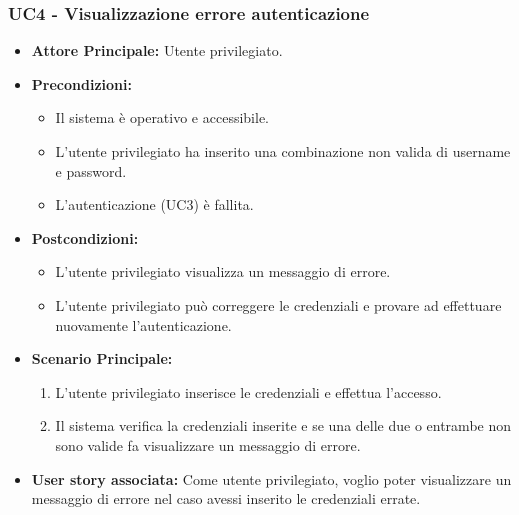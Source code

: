 \documentclass[11pt]{article}
\begin{document}
\begin{justify}
\subsubsection{\textbf{UC4 - Visualizzazione errore autenticazione}}
\begin{itemize}
    \item \textbf{Attore Principale:} Utente privilegiato.
    \item \textbf{Precondizioni:}
        \begin{itemize}
            \item Il sistema è operativo e accessibile.
            \item L'utente privilegiato ha inserito una combinazione non valida di username e password.
            \item L'autenticazione (UC3) è fallita.
        \end{itemize}
    \item \textbf{Postcondizioni:}
        \begin{itemize}
            \item L’utente privilegiato visualizza un messaggio di errore.
            \item L’utente privilegiato può correggere le credenziali e provare ad effettuare nuovamente l'autenticazione.
        \end{itemize}
    \item \textbf{Scenario Principale:}
        \begin{enumerate}
            \item L'utente privilegiato inserisce le credenziali e effettua l'accesso.
            \item Il sistema verifica la credenziali inserite e se una delle due o entrambe non sono valide fa visualizzare un messaggio di errore.
        \end{enumerate}
    \item \textbf{User story associata:} Come utente privilegiato, voglio poter visualizzare un messaggio di errore nel caso avessi inserito le credenziali errate.
\end{itemize}

\end{justify}
\end{document}
